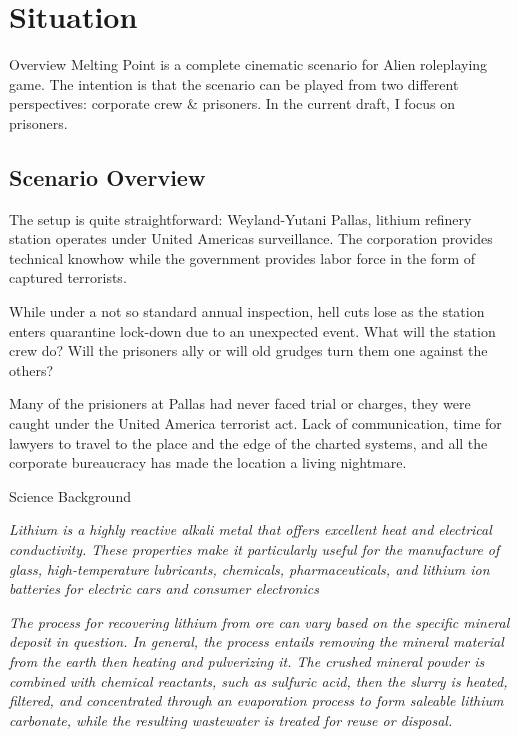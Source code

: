 \chapter{Situation}

\begin{rpg-commentbox}{Overview}
    Melting Point is a complete cinematic scenario for Alien roleplaying game. The intention is that the scenario can be played from two different perspectives: corporate crew \& prisoners. In the current draft, I focus on prisoners.
\end{rpg-commentbox}


\section{Scenario Overview}

The setup is quite straightforward: Weyland-Yutani Pallas, lithium refinery station operates under United Americas surveillance. 
The corporation provides technical knowhow while the government provides labor force in the form of captured terrorists. 


While under a not so standard annual inspection, hell cuts lose as the station enters quarantine lock-down due to an unexpected event.
What will the station crew do? Will the prisoners ally or will old grudges turn them one against the others? 

Many of the prisioners at Pallas had never faced trial or charges, they were caught under the United America terrorist act. Lack of communication, time for lawyers to travel to the place and the edge of the charted systems, and all the corporate bureaucracy has made the location a living nightmare.  




\medskip
\begin{rpg-commentbox}{Science Background}
\begin{small}
\textit{Lithium is a highly reactive alkali metal that offers excellent heat and electrical conductivity.  These properties make it particularly useful for the manufacture of glass, high-temperature lubricants, chemicals, pharmaceuticals, and lithium ion batteries for electric cars and consumer electronics}

\textit{The process for recovering lithium from ore can vary based on the specific mineral deposit in question. In general, the process entails removing the mineral material from the earth then heating and pulverizing it. The crushed mineral powder is combined with chemical reactants, such as sulfuric acid, then the slurry is heated, filtered, and concentrated through an evaporation process to form saleable lithium carbonate, while the resulting wastewater is treated for reuse or disposal.}    
\end{small}
\end{rpg-commentbox}




